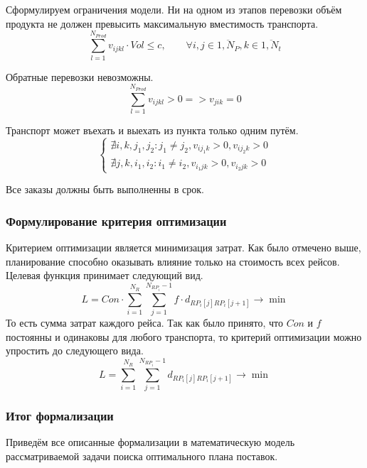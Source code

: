 	Сформулируем ограничения модели. Ни на одном из этапов перевозки объём продукта не должен превысить максимальную вместимость транспорта.
	\begin{equation}
		\sum_{l=1}^{N_{Prod}} v_{ijkl} \cdot Vol \le c, \qquad \forall i, j \in \overline{1, N_P}, k \in \overline{1, N_t}
	\end{equation}

	Обратные перевозки невозможны.
	\begin{equation}
		\sum_{l=1}^{N_{Prod}} v_{ijkl} > 0 => v_{jik} = 0
	\end{equation}

	Транспорт может въехать и выехать из пункта только одним путём.
	\begin{equation}
		\left\{
		\begin{array}{ccc}
			\nexists i, k, j_1, j_2: j_1 \ne j_2, v_{ij_1k} > 0, v_{ij_2k} > 0 \\
			\nexists j, k, i_1, i_2: i_1 \ne i_2, v_{i_1jk} > 0, v_{i_2jk} > 0 
		\end{array}
		\right.
	\end{equation}

	Все заказы должны быть выполненны в срок. 
	
	\subsubsection{Формулирование критерия оптимизации}   
	Критерием оптимизации является минимизация затрат. Как было отмечено выше, планирование способно оказывать влияние только на стоимость всех рейсов. Целевая функция принимает следующий вид.
	\begin{equation}
		L = Con \cdot \sum_{i=1}^{N_R} \sum_{j=1}^{N_{RP_i} - 1} f \cdot d_{RP_i[j] RP_i[j+1]} \to \min
	\end{equation}
	То есть сумма затрат каждого рейса. Так как было принято, что $Con$ и $f$ постоянны и одинаковы для любого транспорта, то критерий оптимизации можно упростить до следующего вида.
	\begin{equation}
		L = \sum_{i=1}^{N_R} \sum_{j=1}^{N_{RP_i} - 1} d_{RP_i[j] RP_i[j+1]} \to \min
	\end{equation}

	\subsubsection*{Итог формализации}
	Приведём все описанные формализации в математическую модель рассматриваемой задачи поиска оптимального плана поставок.

